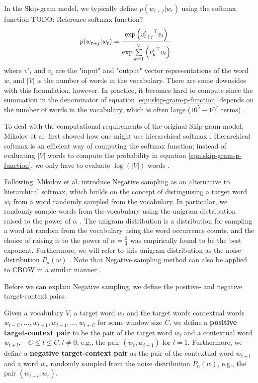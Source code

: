 \noindent
In the Skip-gram model, we typically define $p(w_{t+j} | w_t)$ using the softmax function \cite{mikolov2013b} TODO: Reference softmax function?
\begin{align}
    p(w_{t+j} | w_t)
    &= \frac{\exp{ \left( {v'_{t+j}}^\top v_t \right) }} {\exp{  \sum\limits_{k=1}^{|V|} \left( {v'_k}^\top v_t \right) }}
    \label{eqn:skip-gram-p-function}
\end{align}
where $v'_t$ and $v_t$ are the "input" and "output" vector representations of the word $w$, and $|V|$ is the number of words in the vocabulary. There are some downsides with this formulation, however. In practice, it becomes hard to compute since the summation in the denominator of equation \ref{eqn:skip-gram-p-function} depends on the number of words in the vocabulary, which is often large ($10^5 - 10^7$ terms) \cite{mikolov2013b}.

\noindent
To deal with the computational requirements of the original Skip-gram model, Mikolov et al. first showed how one might use hierarchical softmax \cite{mikolov2013b}. Hierarchical softmax is an efficient way of computing the softmax function; instead of evaluating $|V|$ words to compute the probability in equation \ref{eqn:skip-gram-p-function}, we only have to evaluate $\log \left( |V| \right)$ words \cite{mikolov2013b}.

\noindent
Following, Mikolov et al. introduce Negative sampling as an alternative to hierarchical softmax, which builds on the concept of distinguising a target word $w_t$ from a word randomly sampled from the vocabulary. In particular, we randomly sample words from the vocabulary using the unigram distribution raised to the power of $\alpha$ \cite{mikolov2013b}. The unigram distribution is a distribution for sampling a word at random from the vocabulary using the word occurrence counts, and the choice of raising it to the power of $\alpha = \frac{3}{4}$ was empirically found to be the best exponent. Furthermore, we will refer to this unigram distribution as the noise distribution $P_n(w)$ \cite{mikolov2013b}. Note that Negative sampling method can also be applied to CBOW in a similar manner \cite{mikolov2013b}.

\noindent
Before we can explain Negative sampling, we define the positive- and negative target-context pairs.
\begin{definition}
Given a vocabulary $V$, a target word $w_t$ and the target words contextual words $w_{t-C}, \ldots, w_{t-1}, w_{t+1}, \ldots, w_{t+C}$ for some window size $C$, we define a \textbf{positive target-context pair} to be the pair of the target word $w_t$ and a contextual word $w_{t+l}$, $-C \leq l \leq C, l \neq 0$, e.g., the pair $\left( w_t, w_{t+1} \right)$ for $l=1$. Furthermore, we define a \textbf{negative target-context pair} as the pair of the contextual word $w_{t+l}$ and a word $w_r$ randomly sampled from the noise distribution $P_n(w)$, e.g., the pair $\left( w_{t+l}, w_r \right)$.
\end{definition}

